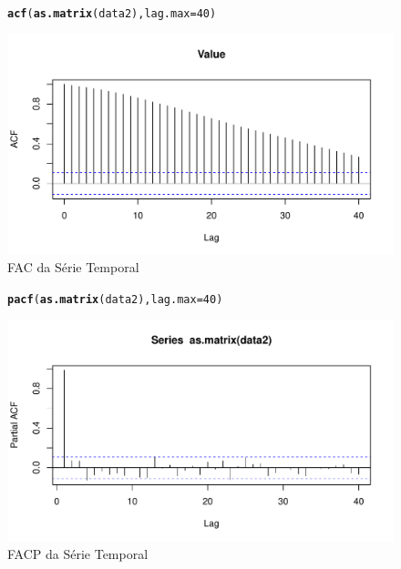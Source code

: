 \documentclass{article}\usepackage[]{graphicx}\usepackage[]{color}
\makeatletter
\def\maxwidth{ %
  \ifdim\Gin@nat@width>\linewidth
    \linewidth
  \else
    \Gin@nat@width
  \fi
}
\newcommand{\hlnum}[1]{\textcolor[rgb]{0.686,0.059,0.569}{#1}}%
\newcommand{\hlstd}[1]{\textcolor[rgb]{0.345,0.345,0.345}{#1}}%
\newcommand{\hlkwc}[1]{\textcolor[rgb]{0.333,0.667,0.333}{#1}}%
\newcommand{\hlkwd}[1]{\textcolor[rgb]{0.737,0.353,0.396}{\textbf{#1}}}%
\newenvironment{kframe}{%
 \def\at@end@of@kframe{}%
 \ifinner\ifhmode%
  \def\at@end@of@kframe{\end{minipage}}%
  \begin{minipage}{\columnwidth}%
 \fi\fi%
 \def\FrameCommand##1{\hskip\@totalleftmargin \hskip-\fboxsep
 \colorbox{shadecolor}{##1}\hskip-\fboxsep
     \hskip-\linewidth \hskip-\@totalleftmargin \hskip\columnwidth}%
 \MakeFramed {\advance\hsize-\width
   \@totalleftmargin\z@ \linewidth\hsize
   \@setminipage}}%
 {\par\unskip\endMakeFramed%
 \at@end@of@kframe}
\newenvironment{knitrout}{}{} %
\makeatother
\begin{document}
            \begin{figure}[H]
            \caption{FAC da Série Temporal}
            \centering
\begin{knitrout}
\color{fgcolor}\begin{kframe}
\begin{alltt}
\hlkwd{acf}\hlstd{(}\hlkwd{as.matrix}\hlstd{(data2),} \hlkwc{lag.max}\hlstd{=}\hlnum{40}\hlstd{)}
\end{alltt}
\end{kframe}
\includegraphics[width=\maxwidth]{figure/unnamed-chunk-76-1} 

\end{knitrout}
            \end{figure}
            
            \begin{figure}[H]
            \caption{FACP da Série Temporal}
            \centering
\begin{knitrout}
\color{fgcolor}\begin{kframe}
\begin{alltt}
\hlkwd{pacf}\hlstd{(}\hlkwd{as.matrix}\hlstd{(data2),} \hlkwc{lag.max}\hlstd{=}\hlnum{40}\hlstd{)}
\end{alltt}
\end{kframe}
\includegraphics[width=\maxwidth]{figure/unnamed-chunk-77-1} 

\end{knitrout}
            \end{figure}
            
\end{document}
